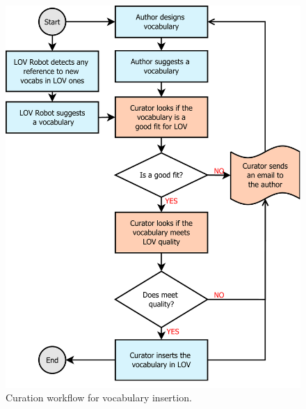 \documentclass{iosart2c}
\begin{document}
\begin{figure}[ht!b]
\includegraphics[width=1\textwidth]{FlowCharts/DiagramInsert.pdf}
\caption{Curation workflow for vocabulary insertion.}
\label{fig:insertWorkflow}
\end{figure}
\end{document}
